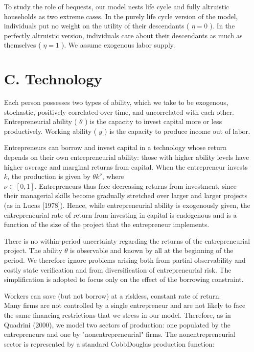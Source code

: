 \documentclass[10pt]{article}
\begin{document}
To study the role of bequests, our model nests life cycle and fully altruistic households as two extreme cases. In the purely life cycle version of the model, individuals put no weight on the utility of their descendants ( $\eta=0$ ). In the perfectly altruistic version, individuals care about their descendants as much as themselves ( $\eta=1$ ). We assume exogenous labor supply.

\section*{C. Technology}
Each person possesses two types of ability, which we take to be exogenous, stochastic, positively correlated over time, and uncorrelated with each other. Entrepreneurial ability ( $\theta$ ) is the capacity to invest capital more or less productively. Working ability ( $y$ ) is the capacity to produce income out of labor.

Entrepreneurs can borrow and invest capital in a technology whose return depends on their own entrepreneurial ability: those with higher ability levels have higher average and marginal returns from capital. When the entrepreneur invests $k$, the production is given by $\theta k^{\nu}$, where\\
$\nu \in[0,1]$. Entrepreneurs thus face decreasing returns from investment, since their managerial skills become gradually stretched over larger and larger projects (as in Lucas [1978]). Hence, while entrepreneurial ability is exogenously given, the entrepreneurial rate of return from investing in capital is endogenous and is a function of the size of the project that the entrepreneur implements.

There is no within-period uncertainty regarding the returns of the entrepreneurial project. The ability $\theta$ is observable and known by all at the beginning of the period. We therefore ignore problems arising both from partial observability and costly state verification and from diversification of entrepreneurial risk. The simplification is adopted to focus only on the effect of the borrowing constraint.

Workers can save (but not borrow) at a riskless, constant rate of return.\\
Many firms are not controlled by a single entrepreneur and are not likely to face the same financing restrictions that we stress in our model. Therefore, as in Quadrini (2000), we model two sectors of production: one populated by the entrepreneurs and one by "nonentrepreneurial" firms. The nonentrepreneurial sector is represented by a standard CobbDouglas production function:
\end{document}
